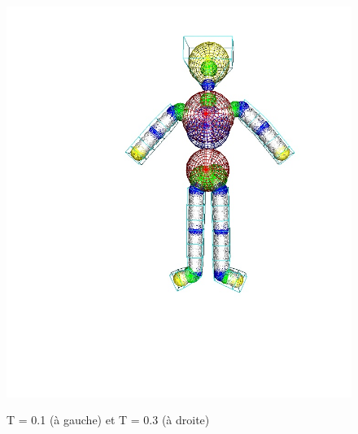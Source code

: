 \documentclass[9pt]{beamer}
\begin{document}
\begin{frame}
\begin{figure}[H]
{     		\includegraphics[scale=0.25]{images/sweeping2.jpg}
     		\hspace*{0.5cm}  
  		}
  		\caption{T = 0.1 (à gauche) et T = 0.3 (à droite)}
	\end{figure}
	
\end{frame}

\end{document}
